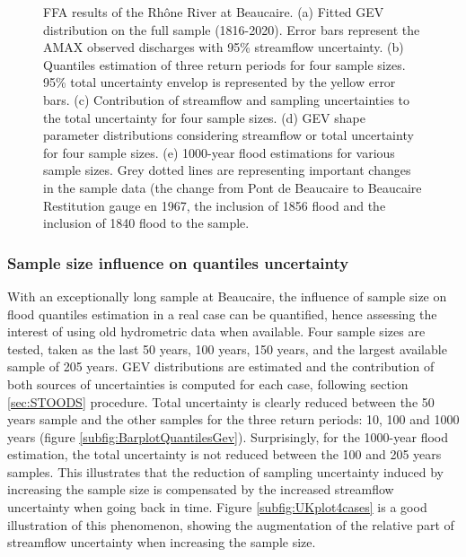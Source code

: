 \documentclass[11pt]{article}
\begin{document}
\begin{figure}[p]
            
        \caption{FFA results of the Rhône River at Beaucaire. (a) Fitted GEV distribution on the full sample (1816-2020). Error bars represent the AMAX observed discharges with 95\% streamflow uncertainty.
        (b) Quantiles estimation of three return periods for four sample sizes. 95\% total uncertainty envelop is represented by the yellow error bars. 
        (c) Contribution of streamflow and sampling uncertainties to the total uncertainty for four sample sizes. 
        (d) GEV shape parameter distributions considering streamflow or total uncertainty for four sample sizes. (e) 1000-year flood estimations for various sample sizes. Grey dotted lines are representing important changes in the sample data (the change from Pont de Beaucaire to Beaucaire Restitution gauge en 1967, the inclusion of 1856 flood and the inclusion of 1840 flood to the sample.}
        \label{fig:Quantiles}
        \end{figure}

        \subsubsection{Sample size influence on quantiles uncertainty}
        
        With an exceptionally long sample at Beaucaire, the influence of sample size on flood quantiles estimation in a real case can be quantified, hence assessing the interest of using old hydrometric data when available. Four sample sizes are tested, taken as the last 50 years, 100 years, 150 years, and the largest available sample of 205 years. GEV distributions are estimated and the contribution of both sources of uncertainties is computed for each case, following section \ref{sec:STOODS} procedure. Total uncertainty is clearly reduced between the 50 years sample and the other samples for the three return periods: 10, 100 and 1000 years (figure \ref{subfig:BarplotQuantilesGev}). Surprisingly, for the 1000-year flood estimation, the total uncertainty is not reduced between the 100 and 205 years samples. This illustrates that the reduction of sampling uncertainty induced by increasing the sample size is compensated by the increased streamflow uncertainty when going back in time. Figure \ref{subfig:UKplot4cases} is a good illustration of this phenomenon, showing the augmentation of the relative part of streamflow uncertainty when increasing the sample size.
        
\end{document}
